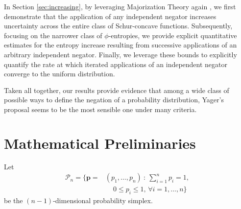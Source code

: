 \documentclass[pdflatex,sn-basic,iicol]{sn-jnl}%
\theoremstyle{thmstyleone}%
\theoremstyle{thmstyletwo}%
\theoremstyle{thmstylethree}%
\newcommand{\cP}{\mathcal{P}}
\newcommand{\bp}{\mathbf{p}}
\begin{document}
In Section \ref{sec:increasing}, by leveraging Majorization Theory again \citep{marshall1979inequalities}, we first demonstrate that the application of any independent negator increases uncertainty across the entire class of Schur-concave functions. Subsequently, focusing on the narrower class of $\phi$-entropies, we provide explicit quantitative estimates for the entropy increase resulting from successive applications of an arbitrary independent negator. Finally, we leverage these bounds to explicitly quantify the rate at which iterated applications of an independent negator converge to the uniform distribution. 


Taken all together, our results provide evidence that among a wide class of possible ways to define 
the negation of a probability distribution, Yager's proposal seems to be the most sensible one under many criteria.

\section{Mathematical Preliminaries}\label{sec:pre}

Let 
\begin{align*}
        \cP_n = \{\bp=&(p_1,\dots,p_n)\ :\   \sum_{i=1}^n p_i = 1,\\&\quad\, 0\leq p_i\leq1,\,\forall i=1,\dots,n\}
\end{align*}
be the $(n-1)$-dimensional probability simplex.
\end{document}
